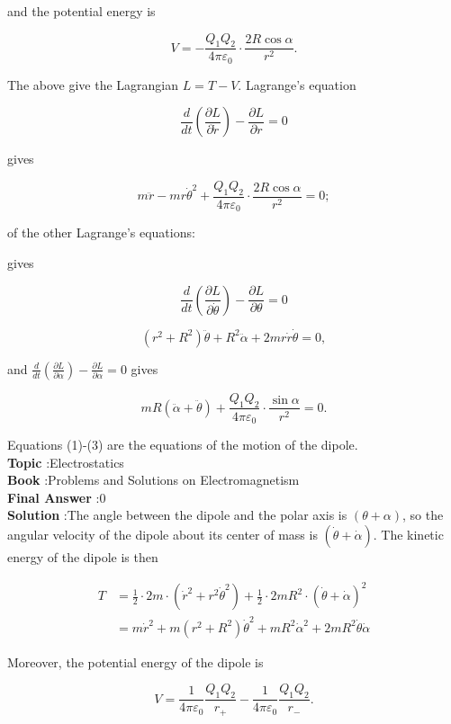 \documentclass[10pt]{article}
\begin{document}
and the potential energy is

$$
V=-\frac{Q_{1} Q_{2}}{4 \pi \varepsilon_{0}} \cdot \frac{2 R \cos \alpha}{r^{2}} .
$$

The above give the Lagrangian $L=T-V$. Lagrange's equation

$$
\frac{d}{d t}\left(\frac{\partial L}{\partial \dot{r}}\right)-\frac{\partial L}{\partial r}=0
$$

gives

$$
m \ddot{r}-m r \dot{\theta}^{2}+\frac{Q_{1} Q_{2}}{4 \pi \varepsilon_{0}} \cdot \frac{2 R \cos \alpha}{r^{2}}=0 ;
$$

of the other Lagrange's equations:

gives

$$
\frac{d}{d t}\left(\frac{\partial L}{\partial \dot{\theta}}\right)-\frac{\partial L}{\partial \theta}=0
$$

$$
\left(r^{2}+R^{2}\right) \ddot{\theta}+R^{2} \ddot{\alpha}+2 m r \dot{r} \dot{\theta}=0,
$$

and $\frac{d}{d t}\left(\frac{\partial L}{\partial \dot{\alpha}}\right)-\frac{\partial L}{\partial \alpha}=0$ gives

$$
m R(\ddot{\alpha}+\ddot{\theta})+\frac{Q_{1} Q_{2}}{4 \pi \varepsilon_{0}} \cdot \frac{\sin \alpha}{r^{2}}=0 .
$$

Equations (1)-(3) are the equations of the motion of the dipole.
\\
\textbf{Topic} :Electrostatics\\
\textbf{Book} :Problems and Solutions on Electromagnetism\\
\textbf{Final Answer} :0\\


\textbf{Solution} :The angle between the dipole and the polar axis is $(\theta+\alpha)$, so the angular velocity of the dipole about its center of mass is $(\dot{\theta}+\dot{\alpha})$. The kinetic energy of the dipole is then

$$
\begin{aligned}
T &=\frac{1}{2} \cdot 2 m \cdot\left(\dot{r}^{2}+r^{2} \dot{\theta}^{2}\right)+\frac{1}{2} \cdot 2 m R^{2} \cdot(\dot{\theta}+\dot{\alpha})^{2} \\
&=m \dot{r}^{2}+m\left(r^{2}+R^{2}\right) \dot{\theta}^{2}+m R^{2} \dot{\alpha}^{2}+2 m R^{2} \dot{\theta} \dot{\alpha}
\end{aligned}
$$

Moreover, the potential energy of the dipole is

$$
V=\frac{1}{4 \pi \varepsilon_{0}} \frac{Q_{1} Q_{2}}{r_{+}}-\frac{1}{4 \pi \varepsilon_{0}} \frac{Q_{1} Q_{2}}{r_{-}} .
$$
\end{document}
